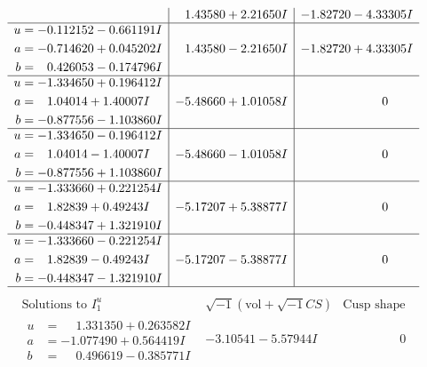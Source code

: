 \documentclass[1p]{elsarticle_modified}
\theoremstyle{definition}
\newcommand{\I}{\sqrt{-1}}
\begin{document}
$$\begin{array}{c|c|c}
 & \phantom{-}1.43580 + 2.21650 I & -1.82720 - 4.33305 I \\ \hline\begin{aligned}
u &= -0.112152 - 0.661191 I \\
a &= -0.714620 + 0.045202 I \\
b &= \phantom{-}0.426053 - 0.174796 I\end{aligned}
 & \phantom{-}1.43580 - 2.21650 I & -1.82720 + 4.33305 I \\ \hline\begin{aligned}
u &= -1.334650 + 0.196412 I \\
a &= \phantom{-}1.04014 + 1.40007 I \\
b &= -0.877556 - 1.103860 I\end{aligned}
 & -5.48660 + 1.01058 I & \phantom{-0.000000 } 0 \\ \hline\begin{aligned}
u &= -1.334650 - 0.196412 I \\
a &= \phantom{-}1.04014 - 1.40007 I \\
b &= -0.877556 + 1.103860 I\end{aligned}
 & -5.48660 - 1.01058 I & \phantom{-0.000000 } 0 \\ \hline\begin{aligned}
u &= -1.333660 + 0.221254 I \\
a &= \phantom{-}1.82839 + 0.49243 I \\
b &= -0.448347 + 1.321910 I\end{aligned}
 & -5.17207 + 5.38877 I & \phantom{-0.000000 } 0 \\ \hline\begin{aligned}
u &= -1.333660 - 0.221254 I \\
a &= \phantom{-}1.82839 - 0.49243 I \\
b &= -0.448347 - 1.321910 I\end{aligned}
 & -5.17207 - 5.38877 I & \phantom{-0.000000 } 0\\
 \hline 
 \end{array}$$\newpage$$\begin{array}{c|c|c}  
\text{Solutions to }I^u_{1}& \I (\text{vol} + \sqrt{-1}CS) & \text{Cusp shape}\\
 \hline 
\begin{aligned}
u &= \phantom{-}1.331350 + 0.263582 I \\
a &= -1.077490 + 0.564419 I \\
b &= \phantom{-}0.496619 - 0.385771 I\end{aligned}
 & -3.10541 - 5.57944 I & \phantom{-0.000000 } 0 \\ \hline\begin{aligned}

\end{aligned}
\end{array}$$
\end{document}
